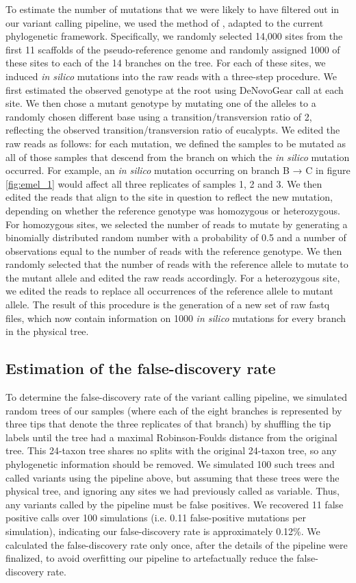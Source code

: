 To estimate the number of mutations that we were likely to have filtered out in our variant calling pipeline, we used the method of \cite{ness_estimate_2012}, adapted to the current phylogenetic framework. Specifically, we randomly selected 14,000 sites from the first 11 scaffolds of the pseudo-reference genome and randomly assigned 1000 of these sites to each of the 14 branches on the tree. For each of these sites, we induced \textit{in silico} mutations into the raw reads with a three-step procedure. We first estimated the observed genotype at the root using DeNovoGear call at each site. We then chose a mutant genotype by mutating one of the alleles to a randomly chosen different base using a transition/transversion ratio of 2, reflecting the observed transition/transversion ratio of eucalypts. We edited the raw reads as follows: for each mutation, we defined the samples to be mutated as all of those samples that descend from the branch on which the \textit{in silico} mutation occurred. For example, an \textit{in silico} mutation occurring on branch B → C in figure \ref{fig:emel_1} would affect all three replicates of samples 1, 2 and 3. We then edited the reads that align to the site in question to reflect the new mutation, depending on whether the reference genotype was homozygous or heterozygous. For homozygous sites, we selected the number of reads to mutate by generating a binomially distributed random number with a probability of 0.5 and a number of observations equal to the number of reads with the reference genotype. We then randomly selected that the number of reads with the reference allele to mutate to the mutant allele and edited the raw reads accordingly. For a heterozygous site, we edited the reads to replace all occurrences of the reference allele to mutant allele. The result of this procedure is the generation of a new set of raw fastq files, which now contain information on 1000 \textit{in silico} mutations for every branch in the physical tree.

\subsection{Estimation of the false-discovery rate}

To determine the false-discovery rate of the variant calling pipeline, we simulated random trees of our samples (where each of the eight branches is represented by three tips that denote the three replicates of that branch) by shuffling the tip labels until the tree had a maximal Robinson-Foulds distance from the original tree. This 24-taxon tree shares no splits with the original 24-taxon tree, so any phylogenetic information should be removed. We simulated 100 such trees and called variants using the pipeline above, but assuming that these trees were the physical tree, and ignoring any sites we had previously called as variable. Thus, any variants called by the pipeline must be false positives. We recovered 11 false positive calls over 100 simulations (i.e. 0.11 false-positive mutations per simulation), indicating our false-discovery rate is approximately 0.12\%. We calculated the false-discovery rate only once, after the details of the pipeline were finalized, to avoid overfitting our pipeline to artefactually reduce the false-discovery rate.

